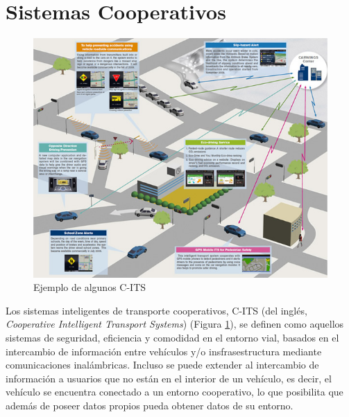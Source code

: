 \section{Sistemas Cooperativos}



\begin{figure}
	\begin{center}
		\includegraphics[scale=0.5]{Imagenes/cits}
		\caption[Ejemplo de algunos C-ITS]{Ejemplo de algunos C-ITS \protect\footnotemark}
		\label{fig:cits}
	\end{center}
\end{figure}


Los sistemas inteligentes de transporte cooperativos, C-ITS (del inglés, \textit{Cooperative Intelligent Transport Systems}) (Figura \ref{fig:cits}), se definen como aquellos sistemas de seguridad, eficiencia y comodidad en el entorno vial, basados en el intercambio de información entre vehículos y/o insfrasestructura mediante comunicaciones inalámbricas. Incluso se puede extender al intercambio de información a usuarios que no están en el interior de un vehículo, es decir, el vehículo se encuentra conectado a un entorno cooperativo, lo que posibilita que además de poseer datos propios pueda obtener datos de su entorno.\\

